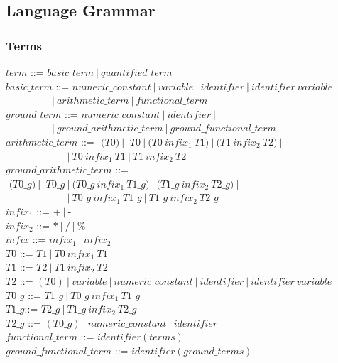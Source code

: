 \documentclass[a4paper,10pt]{article}
\begin{document}
\subsection{Language Grammar}


\subsubsection{Terms}


$term$ ::= $basic\_term~|~quantified\_term$ \\ 
$basic\_term$ ::= $numeric\_constant~|~variable~|~identifier~|~identifier~variable$ \\
$~~~~~~~~~~~~~~~~~~~~~|~arithmetic\_term~|~functional\_term$\\
$ground\_term$ ::= $numeric\_constant~|~identifier~|~$ \\
$~~~~~~~~~~~~~~~~~~~~~|~ground\_arithmetic\_term~|~ground\_functional\_term$\\
$arithmetic\_term$ ::= $\texttt{-(}T0\texttt{)}~|~\texttt{-} T0 ~|~\texttt{(}T0~infix_1~T1\texttt{)}~|~\texttt{(}T1~infix_2~T2\texttt{)}~|~$ \\ $~~~~~~~~~~~~~~~~~~~~~~~~~~~~|~T0~infix_1~T1~|~T1~infix_2~T2$\\
$ground\_arithmetic\_term$ ::= $\texttt{-(}T0\_g\texttt{)}~|~\texttt{-}T0\_g~|~
\texttt{(}T0\_g~infix_1~T1\_g\texttt{)}~|~\texttt{(}T1\_g~infix_2~T2\_g\texttt{)}~|~$ \\ $~~~~~~~~~~~~~~~~~~~~~~~~~~~~|~T0\_g~infix_1~T1\_g~|~T1\_g~infix_2~T2\_g$\\


\noindent
$infix_1$ ::= $ \texttt{+} ~|~ \texttt{-} $\\
$infix_2$ ::= $ \texttt{*} ~|~ \texttt{/}~|~\texttt{\%} $\\
$infix$ ::= $infix_1~|~infix_2$\\
$T0$ ::= $T1~|~T0~infix_1~T1$\\
$T1$ ::= $T2~|~T1~infix_2~T2$ \\
$T2$ ::= $(T0)~|~variable~|~numeric\_constant~|~identifier~|~identifier~variable$ \\

\noindent
$T0\_g$ ::= $T1\_g~|~T0\_g~infix_1~T1\_g$\\
$T1\_g$::= $T2\_g~|~T1\_g~infix_2~T2\_g$ \\
$T2\_g$ ::= $(T0\_g)~|~numeric\_constant~|~identifier$ \\

\noindent
$functional\_term$ ::= $identifier~\texttt{(}~terms~\texttt{)}~$\\
$ground\_functional\_term$ ::= $identifier~\texttt{(}~ground\_terms~\texttt{)}~$\\
\end{document}
